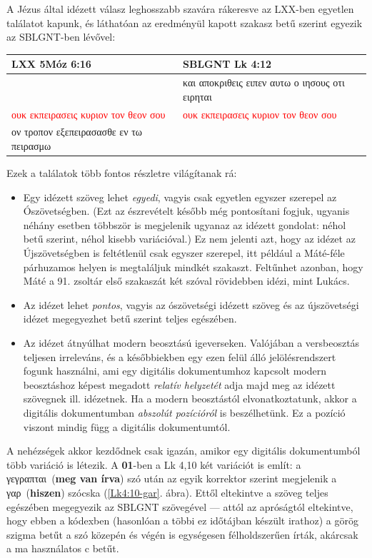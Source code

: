 \documentclass{article}
\newcommand\gr{\selectlanguage{greek}\frenchspacing}
\newcommand\hu{\selectlanguage{magyar}\frenchspacing}
\begin{document}
A Jézus által idézett válasz leghosszabb szavára rákeresve az LXX-ben egyetlen találatot kapunk,
és láthatóan az eredményül kapott szakasz betű szerint egyezik az SBLGNT-ben lévővel:
\begin{center}
\begin{tabular}{p{5cm} p{5cm}}
LXX 5Móz 6:16 & SBLGNT Lk 4:12\\
\hline
& {\gr και αποκριθεις ειπεν αυτω ο ιησους οτι ειρηται}\\
\gr \textcolor{red}{ουκ εκπειρασεις κυριον τον θεον σου} &
\gr \textcolor{red}{ουκ εκπειρασεις κυριον τον θεον σου} \\
\gr ον τροπον εξεπειρασασθε εν τω πειρασμω &
\end{tabular}
\end{center}
\hu
Ezek a találatok több fontos részletre világítanak rá:
\begin{itemize}
\item Egy idézett szöveg lehet \textit{egyedi}, vagyis csak egyetlen egyszer szerepel
az Ószövetségben. (Ezt az észrevételt később még pontosítani fogjuk, ugyanis néhány esetben
többször is megjelenik ugyanaz az idézett gondolat: néhol betű szerint, néhol kisebb variációval.)
Ez nem jelenti azt, hogy az idézet az Újszövetségben is feltétlenül csak egyszer szerepel, itt például
a Máté-féle párhuzamos helyen is megtaláljuk mindkét szakaszt. Feltűnhet azonban, hogy Máté a 91. zsoltár első szakaszát
két szóval rövidebben idézi, mint Lukács. 
\item Az idézet lehet \textit{pontos}, vagyis az ószövetségi idézett szöveg és az újszövetségi idézet megegyezhet
betű szerint teljes egészében.
\item Az idézet átnyúlhat modern beosztású igeverseken. Valójában a versbeosztás teljesen irreleváns,
és a későbbiekben egy ezen felül álló jelölésrendszert fogunk használni, ami egy digitális dokumentumhoz kapcsolt
modern beosztáshoz képest megadott \textit{relatív helyzetét} adja majd meg az idézett szövegnek ill. idézetnek.
Ha a modern beosztástól elvonatkoztatunk, akkor a digitális dokumentumban \textit{abszolút pozícióról} is beszélhetünk.
Ez a pozíció viszont mindig függ a digitális dokumentumtól.
\end{itemize}

A nehézségek akkor kezdődnek csak igazán, amikor egy digitális dokumentumból több variáció is létezik.
A \textbf{01}-ben a Lk 4,10 két variációt is említ: a \gr γεγραπται\hu\ (\textbf{meg van írva}) szó után az egyik
korrektor szerint megjelenik a \gr γαρ\hu\ (\textbf{hiszen}) szócska (\ref{Lk4:10-gar}. ábra). Ettől eltekintve a szöveg
teljes egészében megegyezik az SBLGNT szövegével --- attól az apróságtól eltekintve, hogy ebben a kódexben
(hasonlóan a többi ez időtájban készült irathoz) a görög szigma betűt a szó közepén és végén is
egységesen félholdszerűen írták, akárcsak a ma használatos c betűt.
\end{document}
